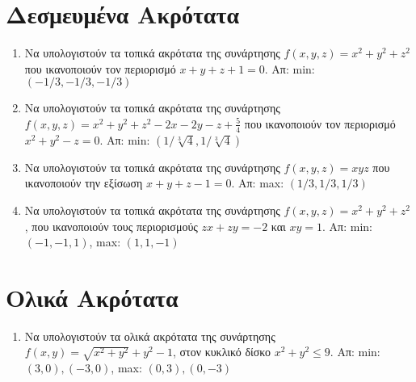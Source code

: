 \section*{Δεσμευμένα Ακρότατα}

\begin{enumerate}
  \item Να υπολογιστούν τα τοπικά ακρότατα της συνάρτησης $ f(x,y,z) = x^{2}+y^{2}+z^{2}
    $ που ικανοποιούν τον περιορισμό $ x+y+z+1=0 $.
    \hfill Απ: min: $ (-1/3,-1/3,-1/3) $ 

  \item Να υπολογιστούν τα τοπικά ακρότατα της συνάρτησης 
    $ f(x,y,z) = x^{2}+y^{2}+z^{2}-2x-2y-z+ \frac{5}{4} $ που ικανοποιούν τον 
    περιορισμό $ x^{2}+y^{2}-z=0  $.
    \hfill Απ: min: $ (1/ \sqrt[3]{4} , 1/ \sqrt[3]{4}) $ 

  \item Να υπολογιστούν τα τοπικά ακρότατα της συνάρτησης 
    $f(x,y,z)=xyz$ που ικανοποιούν την εξίσωση $x+y+z-1=0$.  
    \hfill Απ: max: $ (1/3,1/3,1/3) $ 

  \item Να υπολογιστούν τα τοπικά ακρότατα της συνάρτησης 
    $ f(x,y,z) = x^{2}+y^{2}+z^{2} $, που ικανοποιούν τους περιορισμούς 
    $ zx+zy=-2 $ και $ xy=1 $.
    \hfill Απ: min: $ (-1,-1,1) $, max: $ (1,1,-1) $ 
\end{enumerate}


\section*{Ολικά Ακρότατα}

\begin{enumerate}
  \item Να υπολογιστούν τα ολικά ακρότατα της συνάρτησης $ f(x,y) = \sqrt{x^{2}+y^{2}} +
    y^{2}-1 $, στον κυκλικό δίσκο $ x^{2}+y^{2} \leq 9 $. 
    \hfill Απ: min: $ (3,0), (-3,0) $, max: $ (0,3), (0,-3) $ 
\end{enumerate}






